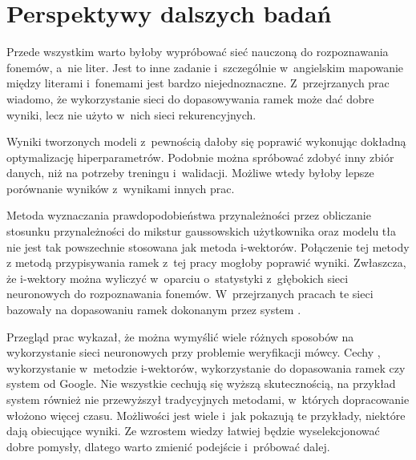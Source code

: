 \section{Perspektywy dalszych badań}

Przede wszystkim warto byłoby wypróbować sieć nauczoną do rozpoznawania fonemów, a~nie liter.
Jest to inne zadanie i~szczególnie w~angielskim mapowanie między literami i~fonemami
jest bardzo niejednoznaczne. Z~przejrzanych prac wiadomo, że wykorzystanie sieci
do dopasowywania ramek może dać dobre wyniki, lecz nie użyto w~nich sieci rekurencyjnych.

Wyniki tworzonych modeli z~pewnością dałoby się poprawić wykonując dokładną
optymalizację hiperparametrów. Podobnie można spróbować zdobyć inny zbiór danych,
niż  na potrzeby treningu i~walidacji. Możliwe wtedy
byłoby lepsze porównanie wyników z~wynikami innych prac.

Metoda wyznaczania prawdopodobieństwa przynależności przez obliczanie stosunku
przynależności do mikstur gaussowskich użytkownika oraz modelu tła nie jest
tak powszechnie stosowana jak metoda i-wektorów. Połączenie tej metody
z metodą przypisywania ramek z~tej pracy mogłoby poprawić wyniki.
Zwłaszcza, że i-wektory można wyliczyć w~oparciu o~statystyki z~głębokich sieci
neuronowych do rozpoznawania fonemów. W~przejrzanych pracach te sieci bazowały
na dopasowaniu ramek dokonanym przez system .

Przegląd prac wykazał, że można wymyślić wiele różnych sposobów na wykorzystanie sieci neuronowych przy problemie
weryfikacji mówcy. Cechy , wykorzystanie  w~metodzie i-wektorów,
wykorzystanie  do dopasowania ramek czy system  od Google.
Nie wszystkie cechują się wyższą skutecznością, na przykład system 
również nie przewyższył tradycyjnych metodami, w~których dopracowanie włożono więcej czasu.
Możliwości jest wiele i~jak pokazują te przykłady, niektóre dają obiecujące wyniki. Ze wzrostem wiedzy łatwiej
będzie wyselekcjonować dobre pomysły, dlatego warto zmienić podejście i~próbować dalej.

